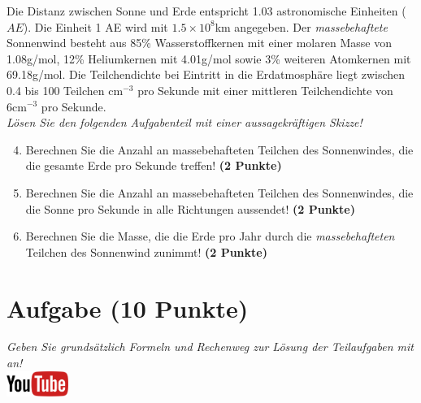 \documentclass[a4paper, 9pt]{scrartcl}\usepackage[]{graphicx}\usepackage[]{xcolor}
\begin{document}
Die Distanz zwischen Sonne und Erde entspricht 1.03 astronomische Einheiten ($AE$). Die Einheit 1 AE wird mit \ensuremath{1.5\times 10^{8}}km angegeben. Der \textit{massebehaftete} Sonnenwind besteht aus 85\% Wasserstoffkernen mit einer molaren Masse von 1.08g/mol, 12\% Heliumkernen mit 4.01g/mol sowie 3\% weiteren Atomkernen mit  69.18g/mol. Die Teilchendichte bei Eintritt in die Erdatmosphäre liegt zwischen 0.4 bis 100 Teilchen cm$^{-3}$ pro Sekunde mit einer mittleren Teilchendichte von 6cm$^{-3}$ pro Sekunde. \\

\textit{Lösen Sie den folgenden Aufgabenteil mit einer aussagekräftigen Skizze!}

\begin{enumerate}
  \setcounter{enumi}{3}
\item Berechnen Sie die Anzahl an massebehafteten Teilchen des Sonnenwindes, die die gesamte Erde pro Sekunde treffen! \textbf{(2 Punkte)}
\item Berechnen Sie die Anzahl an massebehafteten Teilchen des Sonnenwindes, die die Sonne pro Sekunde in alle Richtungen aussendet! \textbf{(2 Punkte)}
\item Berechnen Sie die Masse, die die Erde pro Jahr durch die \textit{massebehafteten} Teilchen des Sonnenwind zunimmt! \textbf{(2 Punkte)}
\end{enumerate}


\clearpage

\section{Aufgabe \hfill (10 Punkte)}

\textit{Geben Sie grunds{\"a}tzlich Formeln und Rechenweg zur L{\"o}sung der
  Teilaufgaben mit an!} \\[1Ex]

\hfill\href{https://youtu.be/n451XnhtSh4}{\includegraphics[width = 2cm]{img/youtube}} %
\hspace{2Ex}
\end{document}

